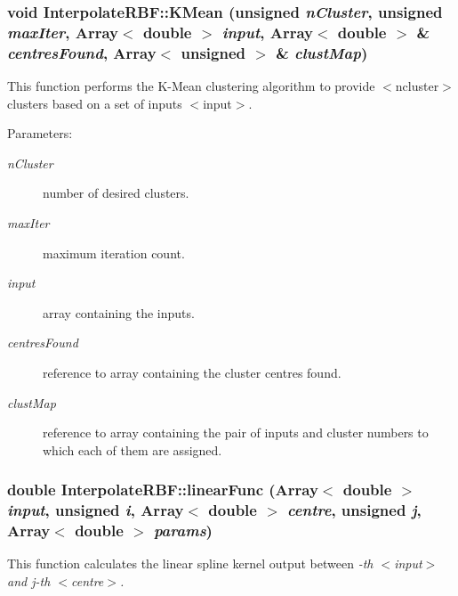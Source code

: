 \subsubsection{\setlength{\rightskip}{0pt plus 5cm}void Interpolate\-RBF::KMean (unsigned {\em n\-Cluster}, unsigned {\em max\-Iter}, Array$<$ double $>$ {\em input}, Array$<$ double $>$ \& {\em centres\-Found}, Array$<$ unsigned $>$ \& {\em clust\-Map})\hspace{0.3cm}{\tt  [static]}}\label{classInterpolateRBF_e7}


This function performs the K-Mean clustering algorithm to provide $<$ncluster$>$ clusters based on a set of inputs $<$input$>$. 

\begin{Desc}
\item[Parameters:]
\begin{description}
\item[{\em n\-Cluster}]number of desired clusters. \item[{\em max\-Iter}]maximum iteration count. \item[{\em input}]array containing the inputs. \item[{\em centres\-Found}]reference to array containing the cluster centres found. \item[{\em clust\-Map}]reference to array containing the pair of inputs and cluster numbers to which each of them are assigned.\end{description}
\end{Desc}
\subsubsection{\setlength{\rightskip}{0pt plus 5cm}double Interpolate\-RBF::linear\-Func (Array$<$ double $>$ {\em input}, unsigned {\em i}, Array$<$ double $>$ {\em centre}, unsigned {\em j}, Array$<$ double $>$ {\em params})\hspace{0.3cm}{\tt  [static]}}\label{classInterpolateRBF_e3}


This function calculates the linear spline kernel output between {\em -th $<$input$>$ and j-th $<$centre$>$. \/}

